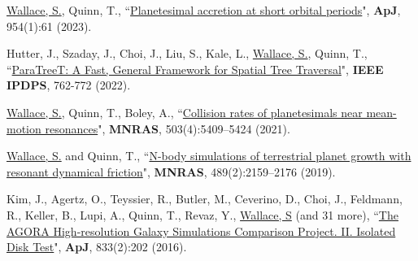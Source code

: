 \documentclass[letterpaper,11pt]{article}
\newcommand{\PaperEntry}[6]{\noindent #1, ``{#2}", \textit{#3} \textbf{#4}, #5 (#6).}
\newcommand{\resumeSubHeadingListStart}{\begin{itemize}[leftmargin=0.15in, label={}]}
\newcommand{\resumeSubHeadingListEnd}{\end{itemize}}
\begin{document}
  \vspace{2pt}
  \resumeSubHeadingListStart
    \small{\item{

\PaperEntry{\underline{Wallace, S.}, Quinn, T.}{\href{https://doi.org/10.3847/1538-4357/ace89c}{Planetesimal accretion at short orbital periods}}{}{ApJ} {954(1):61}{2023} \\ \vspace{6pt}

\PaperEntry{Hutter, J., Szaday, J., Choi, J., Liu, S., Kale, L., \underline{Wallace, S.}, Quinn, T.}{\href{https://doi.org/10.1109/IPDPS53621.2022.00079}{ParaTreeT: A Fast, General Framework for Spatial Tree Traversal}}{}{IEEE IPDPS} {762-772}{2022} \\ \vspace{6pt}

\PaperEntry{\underline{Wallace, S.}, Quinn, T., Boley, A.}{\href{https://doi.org/10.1093/mnras/stab792}{Collision rates of planetesimals near mean-motion resonances}}{}{MNRAS} {503(4):5409–5424}{2021} \\ \vspace{6pt}

\PaperEntry{\underline{Wallace, S.} and Quinn, T.}{\href{https://doi.org/10.1093/mnras/stz2284}{N-body simulations of terrestrial planet growth with resonant dynamical friction}}{}{MNRAS}{489(2):2159–2176}{2019}  \\ \vspace{6pt}

\PaperEntry{Kim, J., Agertz, O., Teyssier, R., Butler, M., Ceverino, D., Choi, J., Feldmann, R., Keller, B., Lupi, A., Quinn, T., Revaz, Y., \underline{Wallace, S} (and 31 more)}{\href{https://doi.org/10.3847/1538-4357/833/2/202}{The AGORA High-resolution Galaxy Simulations Comparison Project. II. Isolated Disk Test}}{}{ApJ}{833(2):202}{2016} \\ \vspace{6pt}
        
    }}
  \resumeSubHeadingListEnd
  
\end{document}
